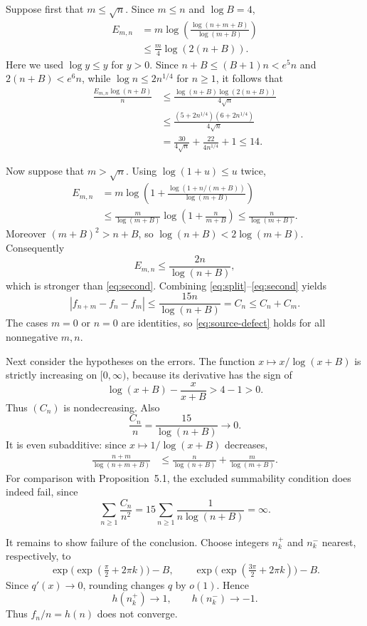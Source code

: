 \documentclass[11pt]{article}
\begin{document}
Suppose first that $m\leq\sqrt n$. Since $m\leq n$ and $\log B=4$,
\begin{align*}
 E_{m,n}
 &=m\log\!\left(\frac{\log(n+m+B)}{\log(m+B)}\right)\\
 &\leq \frac{m}{4}\log(2(n+B)).
\end{align*}
Here we used $\log y\leq y$ for $y>0$. Since
$n+B\leq(B+1)n<e^5n$ and $2(n+B)<e^6n$, while
$\log n\leq2n^{1/4}$ for $n\geq1$, it follows that
\begin{align*}
 \frac{E_{m,n}\log(n+B)}{n}
 &\leq \frac{\log(n+B)\log(2(n+B))}{4\sqrt n}\\
 &\leq\frac{(5+2n^{1/4})(6+2n^{1/4})}{4\sqrt n}\\
 &=\frac{30}{4\sqrt n}+\frac{22}{4n^{1/4}}+1\leq14.
\end{align*}

Now suppose that $m>\sqrt n$. Using $\log(1+u)\leq u$ twice,
\begin{align*}
 E_{m,n}
 &=m\log\!\left(
  1+\frac{\log(1+n/(m+B))}{\log(m+B)}\right)\\
 &\leq\frac{m}{\log(m+B)}\log\!\left(1+\frac{n}{m+B}\right)
 \leq\frac{n}{\log(m+B)}.
\end{align*}
Moreover $(m+B)^2>n+B$, so
$\log(n+B)<2\log(m+B)$. Consequently
\[
 E_{m,n}\leq\frac{2n}{\log(n+B)},
\]
which is stronger than \eqref{eq:second}. Combining
\eqref{eq:split}--\eqref{eq:second} yields
\[
 |f_{n+m}-f_n-f_m|
 \leq\frac{15n}{\log(n+B)}=C_n\leq C_n+C_m.
\]
The cases $m=0$ or $n=0$ are identities, so \eqref{eq:source-defect} holds
for all nonnegative $m,n$.

Next consider the hypotheses on the errors. The function
$x\mapsto x/\log(x+B)$ is strictly increasing on $[0,\infty)$, because its
derivative has the sign of
\[
 \log(x+B)-\frac{x}{x+B}>4-1>0.
\]
Thus $(C_n)$ is nondecreasing. Also
\[
 \frac{C_n}{n}=\frac{15}{\log(n+B)}\longrightarrow0.
\]
It is even subadditive: since $x\mapsto1/\log(x+B)$ decreases,
\begin{align*}
 \frac{n+m}{\log(n+m+B)}
 &\leq\frac{n}{\log(n+B)}+\frac{m}{\log(m+B)}.
\end{align*}
For comparison with Proposition~5.1, the excluded summability condition does
indeed fail, since
\[
 \sum_{n\geq1}\frac{C_n}{n^2}
 =15\sum_{n\geq1}\frac{1}{n\log(n+B)}=\infty.
\]

It remains to show failure of the conclusion. Choose integers $n_k^+$ and
$n_k^-$ nearest, respectively, to
\[
 \exp\!\bigl(\exp(\tfrac\pi2+2\pi k)\bigr)-B,
 \qquad
 \exp\!\bigl(\exp(\tfrac{3\pi}2+2\pi k)\bigr)-B.
\]
Since $q'(x)\to0$, rounding changes $q$ by $o(1)$. Hence
\[
 h(n_k^+)\longrightarrow1,\qquad h(n_k^-)\longrightarrow-1.
\]
Thus $f_n/n=h(n)$ does not converge.
\end{document}
